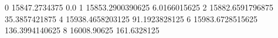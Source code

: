 0 15847.2734375 0.0
1 15853.2900390625 6.0166015625
2 15882.6591796875 35.3857421875
4 15938.4658203125 91.1923828125
6 15983.6728515625 136.3994140625
8 16008.90625 161.6328125
